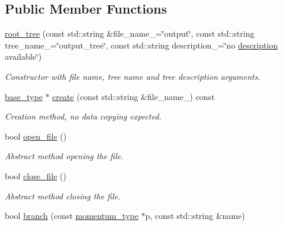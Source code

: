 \subsection*{Public Member Functions}
\begin{DoxyCompactItemize}
\item 
\hypertarget{a00470_a12096cd7504f2a1acc8ff7ded843558c}{\hyperlink{a00470_a12096cd7504f2a1acc8ff7ded843558c}{root\-\_\-tree} (const std\-::string \&file\-\_\-name\-\_\-=\char`\"{}output\char`\"{}, const std\-::string tree\-\_\-name\-\_\-=\char`\"{}output\-\_\-tree\char`\"{}, const std\-::string description\-\_\-=\char`\"{}no \hyperlink{a00315_a366c2b2cfaa58182e2feebc1c30ce94c}{description} available\char`\"{})}\label{a00470_a12096cd7504f2a1acc8ff7ded843558c}

\begin{DoxyCompactList}\small\item\em Constructor with file name, tree name and tree description arguments. \end{DoxyCompactList}\item 
\hypertarget{a00470_a2803c4cd8c150157c39f489f146ea1e4}{\hyperlink{a00315}{base\-\_\-type} $\ast$ \hyperlink{a00470_a2803c4cd8c150157c39f489f146ea1e4}{create} (const std\-::string \&file\-\_\-name\-\_\-) const }\label{a00470_a2803c4cd8c150157c39f489f146ea1e4}

\begin{DoxyCompactList}\small\item\em Creation method, no data copying expected. \end{DoxyCompactList}\item 
\hypertarget{a00470_ae29fa21f91261d513e1e71138ab7649f}{bool \hyperlink{a00470_ae29fa21f91261d513e1e71138ab7649f}{open\-\_\-file} ()}\label{a00470_ae29fa21f91261d513e1e71138ab7649f}

\begin{DoxyCompactList}\small\item\em Abstract method opening the file. \end{DoxyCompactList}\item 
\hypertarget{a00470_ab188c181eef370b5464d77409afc7a94}{bool \hyperlink{a00470_ab188c181eef370b5464d77409afc7a94}{close\-\_\-file} ()}\label{a00470_ab188c181eef370b5464d77409afc7a94}

\begin{DoxyCompactList}\small\item\em Abstract method closing the file. \end{DoxyCompactList}\item 
\hypertarget{a00470_a7be0744a790db35344e4f6342fa0c930}{bool \hyperlink{a00470_a7be0744a790db35344e4f6342fa0c930}{branch} (const \hyperlink{a00559}{momentum\-\_\-type} $\ast$p, const std\-::string \&name)}\label{a00470_a7be0744a790db35344e4f6342fa0c930}


\end{DoxyCompactItemize}
